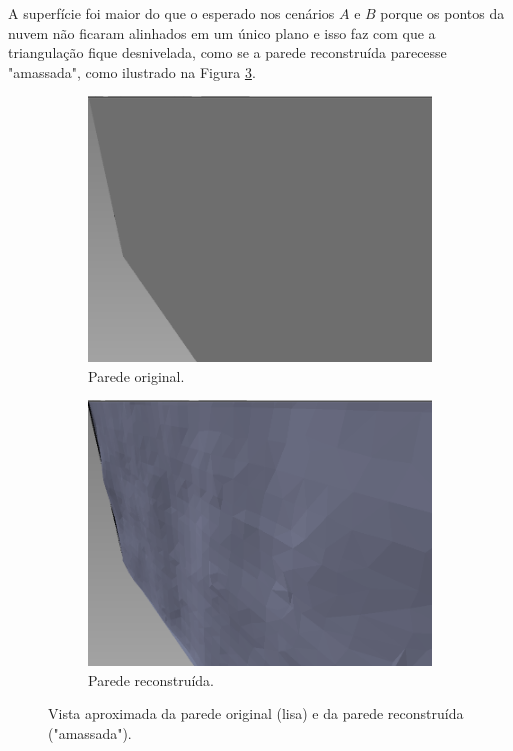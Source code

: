 A superfície foi maior do que o esperado nos cenários $A$ e $B$ porque os pontos da nuvem não ficaram alinhados em um único plano e isso faz com que a triangulação fique desnivelada, como se a parede reconstruída parecesse "amassada", como ilustrado na Figura \ref{fig:lisa_amassada}.

\begin{figure}[H]
    \centering
    \begin{subfigure}[t]{0.45\textwidth}
        \includegraphics[width=\textwidth]{dados/figuras/parede_lisa.png}
        \caption{Parede original.}
        \label{fig:parede_lisa}
    \end{subfigure}
    \hspace{1em}
    \begin{subfigure}[t]{0.45\textwidth}
        \includegraphics[width=\textwidth]{dados/figuras/parede_amassada.png}
        \caption{Parede reconstruída.}
        \label{fig:parede_amassada}
    \end{subfigure}
    \caption{Vista aproximada da parede original (lisa) e da parede reconstruída ("amassada").}
    \label{fig:lisa_amassada}
\end{figure}

